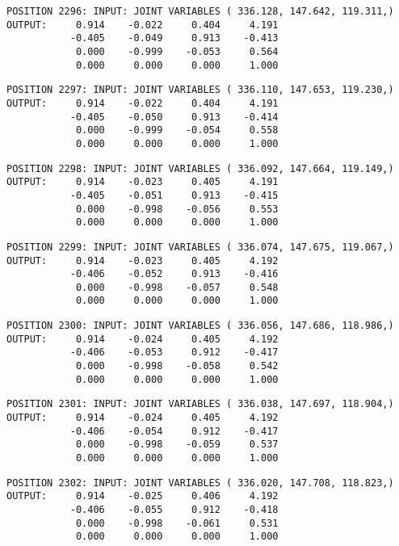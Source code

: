 \begin{verbatim}
POSITION 2296: INPUT: JOINT VARIABLES ( 336.128, 147.642, 119.311,)
OUTPUT:     0.914    -0.022     0.404     4.191
           -0.405    -0.049     0.913    -0.413
            0.000    -0.999    -0.053     0.564
            0.000     0.000     0.000     1.000
\end{verbatim} \pagebreak[1]\begin{verbatim}
POSITION 2297: INPUT: JOINT VARIABLES ( 336.110, 147.653, 119.230,)
OUTPUT:     0.914    -0.022     0.404     4.191
           -0.405    -0.050     0.913    -0.414
            0.000    -0.999    -0.054     0.558
            0.000     0.000     0.000     1.000
\end{verbatim} \pagebreak[1]\begin{verbatim}
POSITION 2298: INPUT: JOINT VARIABLES ( 336.092, 147.664, 119.149,)
OUTPUT:     0.914    -0.023     0.405     4.191
           -0.405    -0.051     0.913    -0.415
            0.000    -0.998    -0.056     0.553
            0.000     0.000     0.000     1.000
\end{verbatim} \pagebreak[1]\begin{verbatim}
POSITION 2299: INPUT: JOINT VARIABLES ( 336.074, 147.675, 119.067,)
OUTPUT:     0.914    -0.023     0.405     4.192
           -0.406    -0.052     0.913    -0.416
            0.000    -0.998    -0.057     0.548
            0.000     0.000     0.000     1.000
\end{verbatim} \pagebreak[1]\begin{verbatim}
POSITION 2300: INPUT: JOINT VARIABLES ( 336.056, 147.686, 118.986,)
OUTPUT:     0.914    -0.024     0.405     4.192
           -0.406    -0.053     0.912    -0.417
            0.000    -0.998    -0.058     0.542
            0.000     0.000     0.000     1.000
\end{verbatim} \pagebreak[1]\begin{verbatim}
POSITION 2301: INPUT: JOINT VARIABLES ( 336.038, 147.697, 118.904,)
OUTPUT:     0.914    -0.024     0.405     4.192
           -0.406    -0.054     0.912    -0.417
            0.000    -0.998    -0.059     0.537
            0.000     0.000     0.000     1.000
\end{verbatim} \pagebreak[1]\begin{verbatim}
POSITION 2302: INPUT: JOINT VARIABLES ( 336.020, 147.708, 118.823,)
OUTPUT:     0.914    -0.025     0.406     4.192
           -0.406    -0.055     0.912    -0.418
            0.000    -0.998    -0.061     0.531
            0.000     0.000     0.000     1.000
\end{verbatim} \pagebreak[1]\begin{verbatim}

\end{verbatim}
